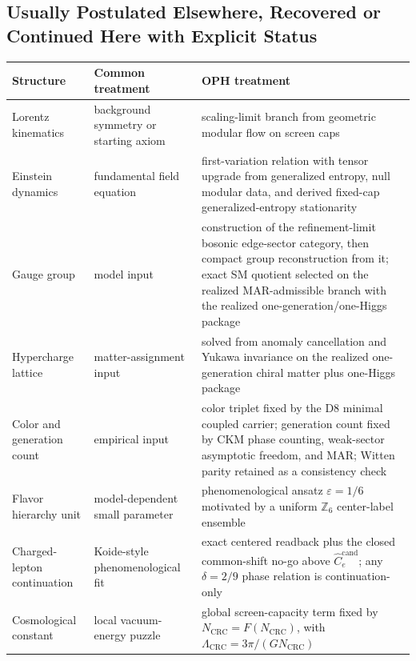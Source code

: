\documentclass[11pt]{article}
\begin{document}
\subsection*{Usually Postulated Elsewhere, Recovered or Continued Here with Explicit Status}

\begingroup
\footnotesize
\begin{tabular}{@{}>{\raggedright\arraybackslash}p{}>{\raggedright\arraybackslash}p{}>{\raggedright\arraybackslash}p{}@{}}
\toprule
Structure & Common treatment & OPH treatment \\
\midrule
Lorentz kinematics & background symmetry or starting axiom & scaling-limit branch from geometric modular flow on screen caps \\
Einstein dynamics & fundamental field equation & first-variation relation with tensor upgrade from generalized entropy, null modular data, and derived fixed-cap generalized-entropy stationarity \\
Gauge group & model input & construction of the refinement-limit bosonic edge-sector category, then compact group reconstruction from it; exact SM quotient selected on the realized MAR-admissible branch with the realized one-generation/one-Higgs package \\
Hypercharge lattice & matter-assignment input & solved from anomaly cancellation and Yukawa invariance on the realized one-generation chiral matter plus one-Higgs package \\
Color and generation count & empirical input & color triplet fixed by the D8 minimal coupled carrier; generation count fixed by CKM phase counting, weak-sector asymptotic freedom, and MAR; Witten parity retained as a consistency check \\
Flavor hierarchy unit & model-dependent small parameter & phenomenological ansatz \(\varepsilon=1/6\) motivated by a uniform \(\mathbb Z_6\) center-label ensemble \\
Charged-lepton continuation & Koide-style phenomenological fit & exact centered readback plus the closed common-shift no-go above \(\widehat C_e^{\mathrm{cand}}\); any \(\delta=2/9\) phase relation is continuation-only \\
Cosmological constant & local vacuum-energy puzzle & global screen-capacity term fixed by \(N_{\mathrm{CRC}}=F(N_{\mathrm{CRC}})\), with \(\Lambda_{\mathrm{CRC}}=3\pi/(G N_{\mathrm{CRC}})\) \\
\bottomrule
\end{tabular}
\endgroup
\end{document}
